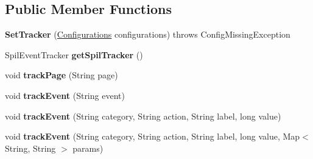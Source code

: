 \subsection*{Public Member Functions}
\begin{DoxyCompactItemize}
\item 
\hypertarget{classcom_1_1spilgames_1_1framework_1_1tracking_1_1impl_1_1_set_tracker_ac724ad59e0cfee504e31913eb04412a0}{{\bfseries Set\-Tracker} (\hyperlink{classcom_1_1spilgames_1_1framework_1_1data_1_1_configurations}{Configurations} configurations)  throws Config\-Missing\-Exception }\label{classcom_1_1spilgames_1_1framework_1_1tracking_1_1impl_1_1_set_tracker_ac724ad59e0cfee504e31913eb04412a0}

\item 
\hypertarget{classcom_1_1spilgames_1_1framework_1_1tracking_1_1impl_1_1_set_tracker_a3f91615a4d1b7c8fccba4a26de413991}{Spil\-Event\-Tracker {\bfseries get\-Spil\-Tracker} ()}\label{classcom_1_1spilgames_1_1framework_1_1tracking_1_1impl_1_1_set_tracker_a3f91615a4d1b7c8fccba4a26de413991}

\item 
\hypertarget{classcom_1_1spilgames_1_1framework_1_1tracking_1_1impl_1_1_set_tracker_a19ee578afe6d27751a417ec4bb135cc6}{void {\bfseries track\-Page} (String page)}\label{classcom_1_1spilgames_1_1framework_1_1tracking_1_1impl_1_1_set_tracker_a19ee578afe6d27751a417ec4bb135cc6}

\item 
\hypertarget{classcom_1_1spilgames_1_1framework_1_1tracking_1_1impl_1_1_set_tracker_afef400a7d95b605583a9de9db667ede8}{void {\bfseries track\-Event} (String event)}\label{classcom_1_1spilgames_1_1framework_1_1tracking_1_1impl_1_1_set_tracker_afef400a7d95b605583a9de9db667ede8}

\item 
\hypertarget{classcom_1_1spilgames_1_1framework_1_1tracking_1_1impl_1_1_set_tracker_aa5f1b0c1efa0f6ba2bc654058497ad5e}{void {\bfseries track\-Event} (String category, String action, String label, long value)}\label{classcom_1_1spilgames_1_1framework_1_1tracking_1_1impl_1_1_set_tracker_aa5f1b0c1efa0f6ba2bc654058497ad5e}

\item 
\hypertarget{classcom_1_1spilgames_1_1framework_1_1tracking_1_1impl_1_1_set_tracker_aa607da9d32327c737206b5f7d3a67e7c}{void {\bfseries track\-Event} (String category, String action, String label, long value, Map$<$ String, String $>$ params)}\label{classcom_1_1spilgames_1_1framework_1_1tracking_1_1impl_1_1_set_tracker_aa607da9d32327c737206b5f7d3a67e7c}


\end{DoxyCompactItemize}
